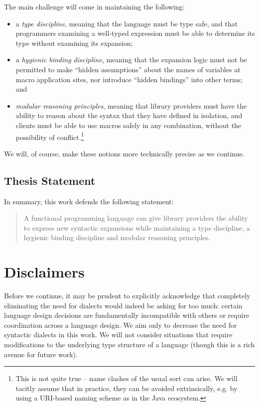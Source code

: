 The main challenge will come in maintaining the following:
\begin{itemize}
\item a \emph{type discipline}, meaning that the language must be type safe, and that programmers examining a well-typed expression must be able to determine its type without examining its expansion; 
\item a \emph{hygienic binding discipline}, meaning that the expansion logic must not be permitted to make ``hidden assumptions'' about the names of variables at macro application sites, nor  introduce ``hidden bindings'' into other terms; and 
\item \emph{modular reasoning principles}, meaning that library providers must have the ability to reason about the syntax that they have defined in isolation, and clients must be able to use macros safely in any combination, without the possibility of conflict.\footnote{This is not quite true --  name clashes of the usual sort can arise. We will tacitly assume that in practice, they can be avoided extrinsically, e.g. by using a URI-based naming scheme as in the Java ecosystem.} 
\end{itemize}
\noindent
We will, of course, make these notions more technically precise as we continue.

\subsection*{Thesis Statement}
In summary, this work defends the following statement:

\begin{quote}
A functional programming language can give library providers the ability to %
express new syntactic expansions while maintaining a type discipline, a hygienic binding discipline and modular reasoning principles. %
\end{quote}
\section{Disclaimers}
Before we continue, it may be prudent to explicitly acknowledge that completely eliminating the need for dialects would indeed be asking for too much: certain language design decisions are fundamentally incompatible with others or require coordination across a language design. We aim only to decrease the need for syntactic dialects in this work. We will not consider situations that require modifications to the underlying type structure of a language (though this is a rich avenue for future work). %

